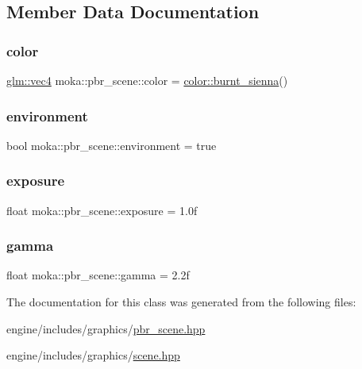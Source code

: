 \subsection{Member Data Documentation}
\mbox{\label{classmoka_1_1pbr__scene_a3ce3c08ad020ecb47c7b06317fc5b162}} 
\subsubsection{\texorpdfstring{color}{color}}
{\footnotesize\ttfamily \mbox{\hyperlink{namespacemoka_aed2224bc0e5b79e57a8975ded94ee1aaa1a9028fd802c481a99491a418ca2fe86}{glm\+::vec4}} moka\+::pbr\+\_\+scene\+::color = \mbox{\hyperlink{classmoka_1_1colour_adf150ab92519483a781f5f42e5161284}{color\+::burnt\+\_\+sienna}}()}

\mbox{\label{classmoka_1_1pbr__scene_a8f57699b3f259cefe33abd4d83f6ca22}} 
\subsubsection{\texorpdfstring{environment}{environment}}
{\footnotesize\ttfamily bool moka\+::pbr\+\_\+scene\+::environment = true}

\mbox{\label{classmoka_1_1pbr__scene_a32d74b9d00c4b1f0eab85a4155f64c2e}} 
\subsubsection{\texorpdfstring{exposure}{exposure}}
{\footnotesize\ttfamily float moka\+::pbr\+\_\+scene\+::exposure = 1.\+0f}

\mbox{\label{classmoka_1_1pbr__scene_a5cb93bbd8f5157363ea52f2569606189}} 
\subsubsection{\texorpdfstring{gamma}{gamma}}
{\footnotesize\ttfamily float moka\+::pbr\+\_\+scene\+::gamma = 2.\+2f}



The documentation for this class was generated from the following files\+:\begin{DoxyCompactItemize}
\item 
engine/includes/graphics/\mbox{\hyperlink{pbr__scene_8hpp}{pbr\+\_\+scene.\+hpp}}\item 
engine/includes/graphics/\mbox{\hyperlink{scene_8hpp}{scene.\+hpp}}\end{DoxyCompactItemize}
